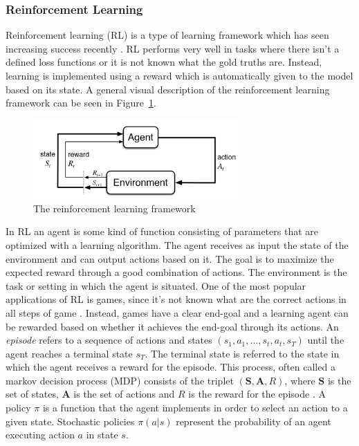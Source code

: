 \documentclass[12pt]{article}
\begin{document}
\subsubsection{Reinforcement Learning} \label{sssec:RL}
Reinforcement learning (RL) \cite{Sutton:1998} is a type of learning framework which has seen increasing success recently \cite{Mnih:2013,Mnih:2015,Silver:2016}. RL performs very well in tasks where there isn't a defined loss functions or it is not known what the gold truths are. Instead, learning is implemented using a reward which is automatically given to the model based on its state. A general visual description of the reinforcement learning framework can be seen in Figure~\ref{fig:RL}.

\begin{figure}[H]
	\centering
	\includegraphics[width=0.7\textwidth]{pics/RL.png}
	\caption{The reinforcement learning framework \cite{Sutton:1998}}
	\label{fig:RL}
\end{figure}

In RL an agent is some kind of function consisting of parameters that are optimized with a learning algorithm. The agent receives as input the state of the environment and can output actions based on it. The goal is to maximize the expected reward through a good combination of actions. The environment is the task or setting in which the agent is situated. One of the most popular applications of RL is games, since it's not known what are the correct actions in all steps of game \cite{Mnih:2013}. Instead, games have a clear end-goal and a learning agent can be rewarded based on whether it achieves the end-goal through its actions. An \textit{episode} refers to a sequence of actions and states \((s_1,a_1,...,s_t,a_t,s_T)\) until the agent reaches a terminal state \(s_T\). The terminal state is referred to the state in which the agent receives a reward for the episode. This process, often called a markov decision process (MDP) consists of the triplet \((\bm{S},\bm{A},R)\), where \(\bm{S}\) is the set of states, \(\bm{A}\) is the set of actions and \(R\) is the reward for the episode \cite{Kandasamy:2017}. A policy \(\pi\) is a function that the agent implements in order to select an action to a given state. Stochastic policies \(\pi(a|s)\) represent the probability of an agent executing action \(a\) in state \(s\).
\end{document}
